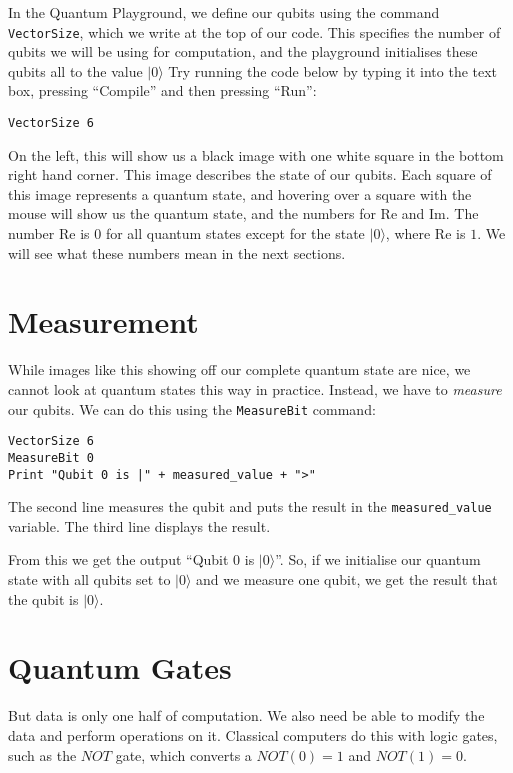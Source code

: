 \documentclass[twocolumn]{article}
\begin{document}
In the Quantum Playground, we define our qubits using the command \texttt{VectorSize}, which we write at the top of our code. This specifies the number of qubits we will be using for computation, and the playground initialises these qubits all to the value $|0\rangle$ Try running the code below by typing it into the text box, pressing ``Compile'' and then pressing ``Run'':

\begin{lstlisting}
VectorSize 6
\end{lstlisting}

On the left, this will show us a black image with one white square in the bottom right hand corner. This image describes the state of our qubits. Each square of this image represents a quantum state, and hovering over a square with the mouse will show us the quantum state, and the numbers for Re and Im. The number Re is $0$ for all quantum states except for the state $|0\rangle$, where Re is $1$. We will see what these numbers mean in the next sections.

\section{Measurement}

While images like this showing off our complete quantum state are nice, we cannot look at quantum states this way in practice. Instead, we have to {\em measure} our qubits. We can do this using the \texttt{MeasureBit} command:

\begin{lstlisting}
VectorSize 6
MeasureBit 0
Print "Qubit 0 is |" + measured_value + ">"
\end{lstlisting}

The second line measures the qubit and puts the result in the \texttt{measured\_value} variable. The third line displays the result.

From this we get the output ``Qubit $0$ is $|0\rangle$''. So, if we initialise our quantum state with all qubits set to $|0\rangle$ and we measure one qubit, we get the result that the qubit is  $|0\rangle$.

\section{Quantum Gates}

But data is only one half of computation. We also need be able to modify the data and perform operations on it. Classical computers do this with logic gates, such as the $NOT$ gate, which converts a $NOT(0) = 1$ and $NOT(1) = 0$.
\end{document}
